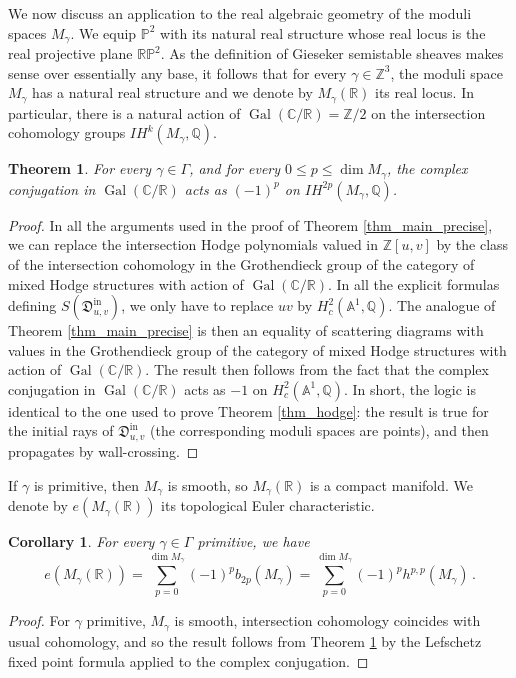\documentclass[12pt, a4paper]{amsart}
\newtheorem{thm}[defn]{Theorem}
\newtheorem{cor}[defn]{Corollary}
\newcommand\A{\mathbb A}
\newcommand\C{\mathbb C}
\newcommand\PP{\mathbb P}
\newcommand\R{\mathbb R}
\newcommand\Q{\mathbb Q}
\newcommand\Z{\mathbb Z}
\newcommand\fD{\mathfrak D}
\newcommand\iin{\mathrm{in}}
\newcommand\Gal{\operatorname{Gal}}
\begin{document}
We now discuss an application to the real algebraic geometry of the moduli spaces 
$M_\gamma$.
We equip $\PP^2$ with its natural real structure whose real locus is the real projective plane $\R \PP^2$. As the definition of Gieseker semistable sheaves
makes sense over essentially any base, it follows that for every 
$\gamma \in \Z^3$, the moduli space $M_\gamma$ has a natural real structure and we denote by $M_\gamma(\R)$ its real locus.
In particular, there is a natural action of $\Gal(\C/\R)=\Z/2$ on the intersection cohomology groups $IH^k(M_\gamma,\Q)$.


\begin{thm} \label{thm_real_moduli}
For every $\gamma \in \Gamma$, and for every $0 \leqslant p \leqslant \dim M_\gamma$, the complex conjugation in
$\Gal(\C/\R)$ acts as $(-1)^p$
on $IH^{2p}(M_\gamma,\Q)$.
\end{thm}

\begin{proof}
In all the arguments used in the proof of Theorem \ref{thm_main_precise}, we can replace the intersection Hodge 
polynomials valued in $\Z[u,v]$ by the class of the intersection cohomology in the Grothendieck group of the category of
mixed Hodge structures with action of 
$\Gal(\C/\R)$. In all the explicit formulas defining 
$S(\fD^\iin_{u,v})$, we only have to replace $uv$ by 
$H^2_c(\A^1,\Q)$. The analogue of Theorem \ref{thm_main_precise} is then an equality of scattering diagrams with values in the Grothendieck group of the category of
mixed Hodge structures with action of 
$\Gal(\C/\R)$.  The result then follows from the fact that the complex conjugation in $\Gal(\C/\R)$ acts as $-1$ on $H^2_c(\A^1,\Q)$. In short, the logic is identical to the one used to prove Theorem \ref{thm_hodge}: the result is true for the initial rays of $\fD^{\iin}_{u,v}$
(the corresponding moduli spaces are points), and then propagates by wall-crossing.
\end{proof}

If $\gamma$ is primitive, then
$M_\gamma$ is smooth, so $M_\gamma(\R)$ is a compact manifold. We denote by
$e(M_\gamma(\R))$ its topological Euler
characteristic.

\begin{cor} \label{cor_real_moduli}
For every $\gamma \in \Gamma$ primitive, we have 
\[ e(M_\gamma(\R))
=\sum_{p=0}^{\dim M_\gamma}
(-1)^p b_{2p}(M_\gamma)
=\sum_{p=0}^{\dim M_\gamma}
(-1)^p h^{p,p}(M_\gamma) \,.\]
\end{cor}

\begin{proof}
For $\gamma$ primitive, $M_\gamma$ is smooth, intersection cohomology coincides with usual cohomology, and so the result follows from Theorem \ref{thm_real_moduli} 
by the Lefschetz fixed point formula applied to the complex conjugation.
\end{proof}
\end{document}
